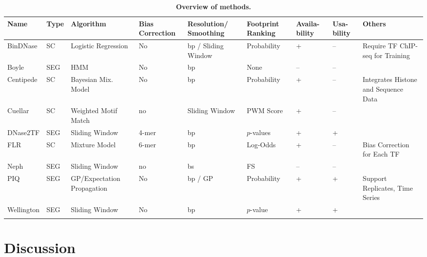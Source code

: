 \begin{footnotesize}
\begin{longtable}{p{1.4cm}p{0.6cm}p{1.7cm}p{1.3cm}p{1.6cm}p{1.6cm}p{0.8cm}p{0.8cm}p{2cm}}
\caption[Overview of methods]{\textbf{Overview of methods.}} \\ 
  \hline
    Name & Type & Algorithm & Bias Correction & Resolution/ Smoothing & Footprint Ranking & Availa- bility & Usa- bility & Others\\
  \hline
    BinDNase & SC & Logistic Regression & No & bp / Sliding Window & Probability & + & -- & Require TF ChIP-seq for Training\\
    Boyle & SEG & HMM & No & bp & None & -- & -- & \\
    Centipede & SC & Bayesian Mix. Model & No & bp & Probability & + & -- & Integrates Histone and Sequence Data\\
    Cuellar & SC & Weighted Motif Match & no & Sliding Window & PWM Score & + & -- & \\
    DNase2TF & SEG & Sliding Window & 4-mer & bp & $p$-values & + & + & \\
    FLR & SC & Mixture Model & 6-mer & bp & Log-Odds & + & -- & Bias Correction for Each TF\\
    Neph & SEG & Sliding Window & no & bs & FS & -- & -- & \\
    PIQ & SEG & GP/Expectation Propagation & No & bp / GP & Probability & + & + & Support Replicates, Time Series\\
    Wellington & SEG & Sliding Window & No & bp & $p$-value & + & + & \\
  \hline
\label{tab:overview_methods} \\
\end{longtable}
\end{footnotesize}

\section{Discussion}
\label{sec:discussion.2}

